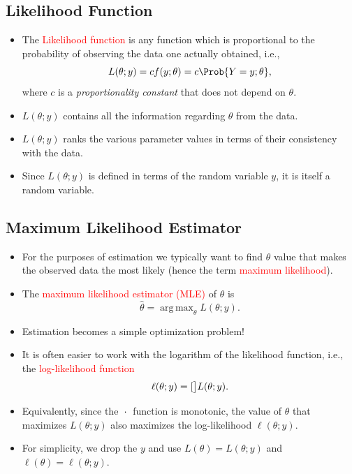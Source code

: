 \documentclass{article}\usepackage[]{graphicx}\usepackage[svgnames]{xcolor}
\let\log\relax%
\DeclareMathOperator*{\argmax}{arg\,max}
\begin{document}
\subsection*{Likelihood Function}
\begin{itemize}
      \item The \textcolor{Red}{Likelihood function} is any function which is proportional to the probability
            of observing the data one actually obtained, i.e.,
            \[ L(\theta;y)=cf(y;\theta)=c\Prob{Y=y;\theta}, \]
            where $ c $ is a \emph{proportionality constant} that does not depend on $ \theta $.
      \item $ L(\theta;y) $ contains all the information regarding $ \theta $ from the data.
      \item $ L(\theta;y) $ ranks the various parameter values in terms of their consistency
            with the data.
      \item Since $ L(\theta;y) $ is defined in terms of the random variable $ y $, it is itself a
            random variable.
\end{itemize}
\subsection*{Maximum Likelihood Estimator}
\begin{itemize}
      \item For the purposes of estimation we typically want to find $ \theta $ value that makes the
            observed data the most likely (hence the term \textcolor{Red}{maximum likelihood}).
      \item The \textcolor{Red}{maximum likelihood estimator (MLE)} of $ \theta $ is
            \[ \hat{\theta}=\argmax_\theta L(\theta;y). \]
      \item Estimation becomes a simple optimization problem!
      \item It is often easier to work with the logarithm of the likelihood function, i.e., the
            \textcolor{Red}{log-likelihood function}
            \[ \ell(\theta;y)=\log[\big]{L(\theta;y)}. \]
      \item Equivalently, since the $ \log{\:\cdot\:} $ function is monotonic, the value of $ \theta $ that maximizes $ L(\theta;y) $ also
            maximizes the log-likelihood $ \ell(\theta;y) $.
      \item For simplicity, we drop the $ y $ and use $ L(\theta)=L(\theta;y) $ and $ \ell(\theta)=\ell(\theta;y) $.
\end{itemize}
\end{document}

